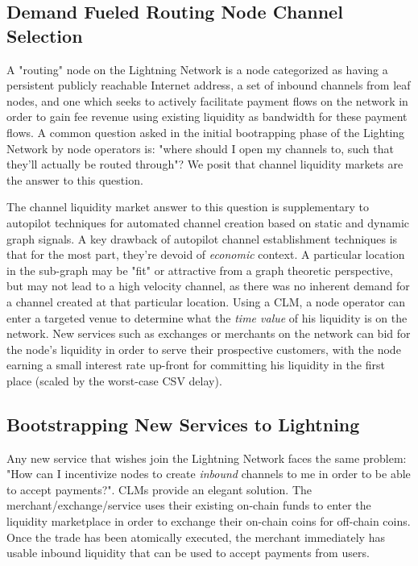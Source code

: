 \documentclass[10pt,a4paper]{article}
\theoremstyle{definition}
\begin{document}
\subsection{Demand Fueled Routing Node Channel Selection}

A "routing" node on the Lightning Network is a node categorized as having a
persistent publicly reachable Internet address, a set of inbound channels from
leaf nodes, and one which seeks to actively facilitate payment flows on the
network in order to gain fee revenue using existing liquidity as
bandwidth for these payment flows. A common question asked in the initial
bootrapping phase of the Lighting Network by node operators is: "where should I
open my channels to, such that they'll actually be routed through"? We posit
that channel liquidity markets are the answer to this question.

The channel liquidity market answer to this question is supplementary to
autopilot \cite{autopilot} techniques for automated channel creation based on
static and dynamic graph signals. A key drawback of autopilot channel
establishment techniques is that for the most part, they're devoid of
\emph{economic} context. A particular location in the sub-graph may be "fit" or
attractive from a graph theoretic perspective, but may not lead to a high
velocity channel, as there was no inherent demand for a channel created at that
particular location. Using a CLM, a node operator can enter a targeted venue to
determine what the \emph{time value} of his liquidity is on the network. New
services such as exchanges or merchants on the network can bid for the node's
liquidity in order to serve their prospective customers, with the node earning
a small interest rate up-front for committing his liquidity in the first place
(scaled by the worst-case CSV delay).

\subsection{Bootstrapping New Services to Lightning}

Any new service that wishes join the Lightning Network faces the same problem:
"How can I incentivize nodes to create \emph{inbound} channels to me in order
to be able to accept payments?". CLMs provide an elegant solution. The
merchant/exchange/service uses their existing on-chain funds to enter the
liquidity marketplace in order to exchange their on-chain coins for off-chain
coins. Once the trade has been atomically executed, the merchant immediately
has usable inbound liquidity that can be used to accept payments from users.
\end{document}

